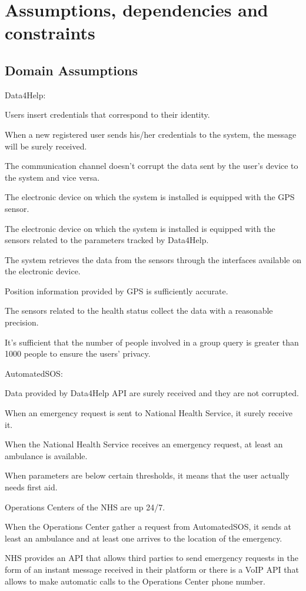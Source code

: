 \section{Assumptions, dependencies and constraints}
\subsection{Domain Assumptions}
Data4Help:  
\begin{enumerate} [label={[D\arabic*]}]
    \item Users insert credentials that correspond to their identity.
    \item When a new registered user sends his/her credentials to the system, the message will be surely received.
    \item The communication channel doesn't corrupt the data sent by the user's device to the system and vice versa.
    \item The electronic device on which the system is installed is equipped with the GPS sensor.
    \item The electronic device on which the system is installed is equipped with the sensors related to the parameters tracked by Data4Help.
    \item The system retrieves the data from the sensors through the interfaces available on the electronic device.
    \item Position information provided by GPS is sufficiently accurate\cite{gps}.
    \item The sensors related to the health status collect the data with a reasonable precision.
    \item It's sufficient that the number of people involved in a group query is greater than 1000 people to ensure the users' privacy.
\end{enumerate}  
\noindent
AutomatedSOS:
\begin{enumerate} [resume, label={[D\arabic*]}]
    \item Data provided by Data4Help API are surely received and they are not corrupted.
    \item When an emergency request is sent to National Health Service, it surely receive it.
    \item When the National Health Service receives an emergency request, at least an ambulance is available.
    \item When parameters are below certain thresholds, it means that the user actually needs first aid.
    \item Operations Centers of the NHS are up 24/7.
    \item When the Operations Center gather a request from AutomatedSOS, it sends at least an ambulance and at least one arrives to the location of the emergency.
    \item NHS provides an API that allows third parties to send emergency requests in the form of an instant message received in their platform or there is a VoIP API that allows to make automatic calls to the Operations Center phone number.
\end{enumerate}